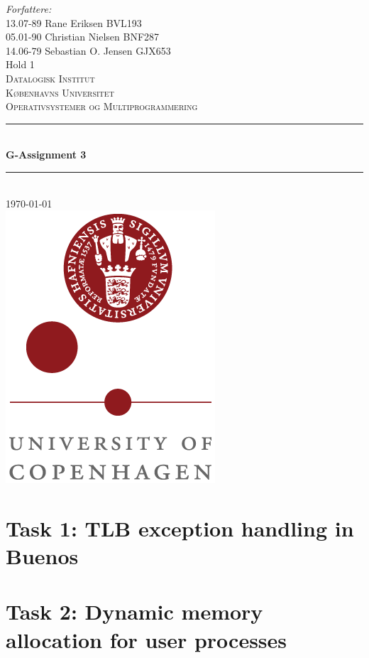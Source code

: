 \documentclass[a4paper,12pt,danish]{report}
\begin{document}
\begin{titlepage}

\newcommand{\HRule}{\rule{\linewidth}{0.4mm}}
\center
\small{ \emph{Forfattere:}\\
13.07-89 Rane Eriksen \textsc{BVL193}
\\
05.01-90 Christian Nielsen \textsc{BNF287}
\\
14.06-79 Sebastian O. Jensen \textsc{GJX653}
\\
Hold 1} \\[2cm]

\textsc{\LARGE Datalogisk Institut}\\[0.5cm]
\textsc{\large Københavns Universitet}\\[1.5cm]
\textsc{\large Operativsystemer og Multiprogrammering}\\
\HRule \\[0.7cm]
{\huge \bfseries G-Assignment 3}\\[0.4cm]
\HRule \\[1.5cm]
\textsc{\Large \textsc{\today}}\\[0.5cm]

\includegraphics[scale=0.5]{ku_logo.png}\\[1cm]

\end{titlepage}
\tableofcontents
\newpage
\renewcommand{\thesection}{\arabic{section}}
\renewcommand{\thempfootnote}{\arabic{mpfootnote}}
\renewcommand\thesubsection{}
\newcommand{\minus}[1]{{#1}^{-}}
\section{Task 1: TLB exception handling in Buenos}
\newpage
\section{Task 2: Dynamic memory allocation for user processes}
\end{document}
